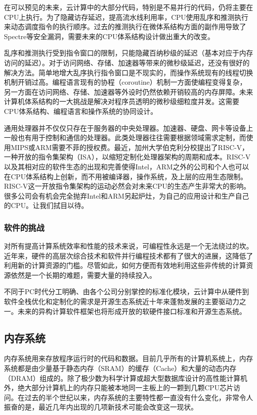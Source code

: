 在可以预见的未来，云计算中的大部分代码，特别是不易并行的代码，仍将主要在CPU上执行。为了隐藏访存延迟，提高流水线利用率，CPU使用乱序和推测执行来动态调度指令的执行顺序。过去的推测执行在微体系结构方面的副作用导致了Spectre等安全漏洞，需要未来的CPU体系结构设计做出重大的改变。

乱序和推测执行受到指令窗口的限制，只能隐藏百纳秒级的延迟（基本对应于内存访问的延迟）。对于访问网络、存储、加速器等带来的微秒级延迟，还没有很好的解决方法。简单地增大乱序执行指令窗口是不现实的，而操作系统现有的线程切换机制开销过高。编程语言现有的协程（coroutine）机制一方面使编程变得复杂，另一方面在访问网络、存储、加速器等外设时仍然依赖开销较高的内存屏障。未来计算机体系结构的一大挑战是解决对程序员透明的微秒级细粒度并发。这需要CPU体系结构、编程语言和操作系统的协同设计。

通用处理器并不仅仅只存在于服务器的中央处理器。加速器、硬盘、网卡等设备上一般也有用于控制和通信的处理器。此类处理器往往需要根据领域需求定制，而使用MIPS或ARM需要不菲的授权费。最近，加州大学伯克利分校提出了RISC-V，一种开放的指令集架构（ISA），以缩短定制化处理器架构的周期和成本。RISC-V以及其相对应的软件生态的出现和完善使得Intel，ARM之外的公司和个人也可以在CPU体系结构上创新，而不用被编译器，操作系统，及上层的应用生态限制。RISC-V这一开放指令集架构的运动必然会对未来CPU的生态产生非常大的影响。很多公司会有机会完全抛弃Intel和ARM另起炉灶，为自己的应用设计和生产自己的CPU。让我们拭目以待。

\subsubsection{软件的挑战}

对所有提高计算系统效率和性能的技术来说，可编程性永远是一个无法绕过的坎。近年来，硬件的高层次综合技术和软件并行编程技术都有了很大的进展，这降低了利用新的计算资源的门槛。尽管如此，如何方便而有效地利用这些非传统的计算资源依然是一个长期的难题，需要大量的持续投入。

不同于PC时代分工明确、由各个公司分别掌控的标准化模块，云计算中从硬件到软件全栈优化和定制化的需求是开源生态系统近十年来蓬勃发展的主要驱动力之一。未来的异构计算软件框架也将形成开放的软硬件接口标准和开源生态系统。

\subsection{内存系统}

内存系统用来存放程序运行时的代码和数据。目前几乎所有的计算机系统上，内存系统都是由少量基于静态内存（SRAM）的缓存（Cache）和大量的动态内存（DRAM）组成的。除了极少数为科学计算或超大型数据库设计的高性能计算机外，绝大部分计算机上的内存只能被本地同一主板上的一颗到几颗CPU芯片访问。在过去的半个世纪以来，内存系统的主要特性都一直没有什么变化，非常令人振奋的是，最近几年内出现的几项新技术可能会改变这一现状。


